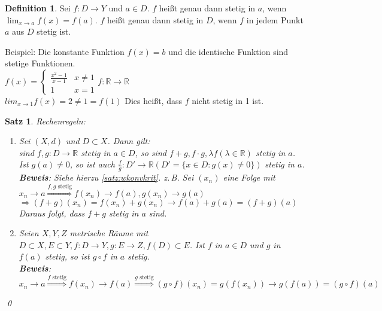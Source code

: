 \documentclass[ngerman,titlepage,twoside, parskip=half*]{scrreprt}
\newcommand*{\R}{\mathbb{R}}
\theoremstyle{plain}
\newtheorem{theorem}{Satz}[section]
\theoremstyle{definition}
\newtheorem{definition}{Definition}
\theoremstyle{remark}
\begin{document}
\begin{definition}
Sei $f\colon D\rightarrow Y$ und $a \in D$. $f$ heißt genau dann stetig in $a$, wenn $\lim_{x\rightarrow a} 
f(x)=f(a)$. $f$ heißt genau dann stetig in $D$, wenn $f$ in jedem Punkt $a$ aus $D$ stetig ist.
\end{definition}
Beispiel: Die konstante Funktion $f(x)=b$ und die identische Funktion sind stetige Funktionen.\\
$f(x)=\begin{cases}\frac{x^2-1}{x-1} & x \neq 1\\1 & x=1\end{cases} f\colon\R\rightarrow \R$\\
$lim_{x\rightarrow 1}f(x)=2\neq 1=f(1)$ Dies heißt, dass $f$ nicht stetig in 1 ist.

\begin{theorem}
Rechenregeln:
\begin{enumerate}[(1)]
  \item Sei $(X,d)$ und $D \subset X$. Dann gilt:\\
    sind $f,g\colon D\rightarrow\R$ stetig in $a \in D$, so sind $f+g, f\cdot g, \lambda f (\lambda \in \R)$
    stetig in $a$. Ist $g(a)\neq 0$, so ist auch $\frac{f}{g}\colon D'\rightarrow \R (D'=\{x\in D\colon g(x)\neq 0\})$
    stetig in $a$.\\
    \textbf{Beweis}: Siehe hierzu \autoref{satz:wkonvkrit}. z.\,B. Sei $(x_n)$ eine Folge mit $x_n\rightarrow a
    \stackrel{f,g \text{ stetig}}{\Longrightarrow} f(x_n)\rightarrow f(a), g(x_n)\rightarrow g(a)$\\
    $\Rightarrow (f+g)(x_n)=f(x_n)+g(x_n)\rightarrow f(a)+g(a)=(f+g)(a)$\\
    Daraus folgt, dass $f+g$ stetig in $a$ sind.
  \item Seien $X,Y,Z$ metrische Räume mit $D\subset X, E\subset Y, f\colon D\rightarrow Y, g\colon E\rightarrow Z,
    f(D)\subset E$. Ist $f$ in $a\in D$ und $g$ in $f(a)$ stetig, so ist $g\circ f$ in $a$ stetig.\\
    \textbf{Beweis}:$x_n\rightarrow a \stackrel{f \text{ stetig}}{\Longrightarrow} f(x_n)\rightarrow f(a)
    \stackrel{g \text{ stetig}}{\Longrightarrow} (g \circ f)(x_n)=g(f(x_n))\rightarrow g(f(a))=(g\circ f)
    (a)$
\end{enumerate}
\qed
\end{theorem}
\end{document}
